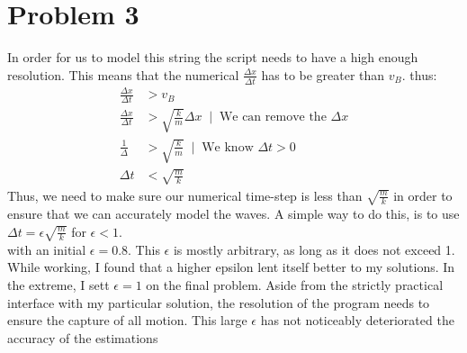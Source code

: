 \documentclass[12pt]{article}
\begin{document}
\section*{Problem 3}
In order for us to model this string the script needs to have a high enough resolution. This means that the numerical $\frac{\Delta x}{\Delta t}$ has to be greater than $v_B$. thus:
\begin{equation}
	\begin{aligned}
		\frac{\Delta x}{\Delta t} &> v_B \\
		\frac{\Delta x}{\Delta t} &> \sqrt{\frac{k}{m}} \Delta x \;\;|\;\;
		\text{We can remove the $\Delta x$} \\
		\frac{1}{\Delta} &> \sqrt{\frac{k}{m}} \;\;|\;\; \text{We know $\Delta t > 0$} \\
		\Delta t &< \sqrt{\frac{m}{k}}
	\end{aligned}
\end{equation}
	Thus, we need to make sure our numerical time-step is less than $\sqrt{\frac{m}{k}}$ in order to ensure that we can accurately model the waves. A simple way to do this, is to use 
$\Delta t = \epsilon\sqrt{\frac{m}{k}}$ for $\epsilon < 1$. \\
	with an initial $\epsilon=0.8$. This $\epsilon$ is mostly arbitrary, as long as it does not exceed 1. While working, I found that a higher epsilon lent itself better to my solutions. In the extreme, I sett $\epsilon = 1$ on the final problem. Aside from the strictly practical interface with my particular solution, the resolution of the program needs to ensure the capture of all motion. This large $\epsilon$ has not noticeably deteriorated the accuracy of the estimations
\end{document}
